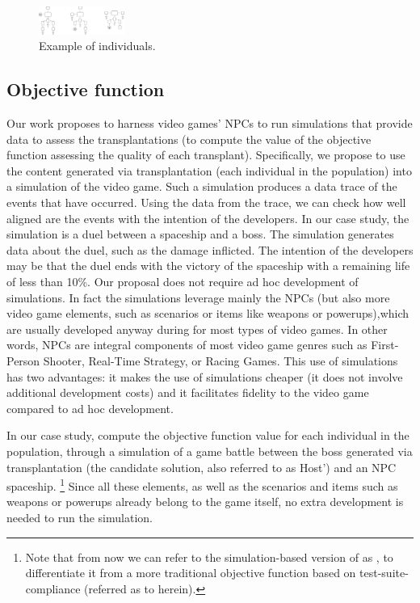 \begin{figure}[tb]
    \centering
    \includegraphics[width=0.25\textwidth]{Figures/candidates.png}
    \caption{Example of individuals.}
    \label{fig:candidates}
\end{figure}

\subsection{Objective function}

Our work proposes to harness video games' NPCs to run simulations that provide data to assess the transplantations (\ie to compute the value of the objective function assessing the quality of each transplant). 
Specifically, we propose to use the content generated via transplantation (each individual in the population) into a simulation of the video game. Such a simulation produces a data trace of the events that have occurred. Using the data from the trace, we can check how well aligned are the events with the intention of the developers. In our case study, the simulation is a duel between a spaceship and a boss. The simulation generates data about the duel, such as the damage inflicted. The intention of the developers may be that the duel ends with the victory of the spaceship with a remaining life of less than 10\%. Our proposal does not require ad hoc development of simulations. In fact the simulations leverage mainly the NPCs (but also more video game elements, such as scenarios or items like weapons or powerups),which are usually developed anyway during for most types of video games. In other words, NPCs are integral components of  most video game genres such as First-Person Shooter, Real-Time Strategy, or Racing Games. This use of simulations has two advantages:  it makes the use of simulations cheaper (\ie it does not involve additional development costs) and it facilitates fidelity to the video game compared to ad hoc development. 

In our case study, \ApproachName{} compute the objective function value for each individual in the population, through a simulation of a game battle between the boss generated via transplantation (\ie the candidate solution, also referred to as Host') and an NPC spaceship. \footnote{Note that from now we can refer to the simulation-based version of \ApproachName as  \simhotep{}, to differentiate it from a more traditional objective function based on test-suite-compliance (referred as to \timhotep herein).} Since all these elements, as well as the scenarios and items such as weapons or powerups already belong to the game itself, no extra development is needed to run the simulation.

